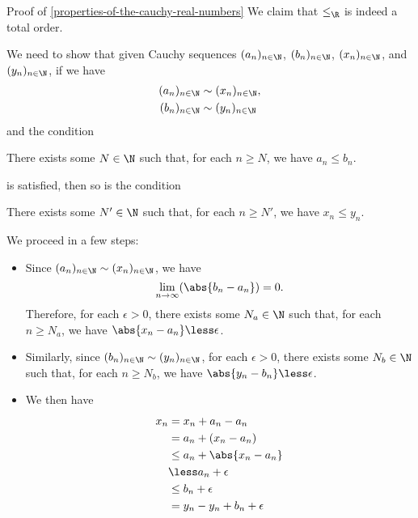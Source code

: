 \begin{Proof}{Proof of \cref{properties-of-the-cauchy-real-numbers}}%
    We claim that $\leq_{\R}$ is indeed a total order.

    We need to show that given Cauchy sequences $(a_{n})_{n\in\N}$, $(b_{n})_{n\in\N}$, $(x_{n})_{n\in\N}$, and $(y_{n})_{n\in\N}$, if we have
    \begin{align*}
        (a_{n})_{n\in\N} &\sim (x_{n})_{n\in\N},\\
        (b_{n})_{n\in\N} &\sim (y_{n})_{n\in\N}
    \end{align*}
    and the condition
    \begin{itemize}
        \itemstar There exists some $N\in\N$ such that, for each $n\geq N$, we have $a_{n}\leq b_{n}$.
    \end{itemize}
    is satisfied, then so is the condition
    \begin{itemize}
        \itemstar There exists some $N'\in\N$ such that, for each $n\geq N'$, we have $x_{n}\leq y_{n}$.
    \end{itemize}
    We proceed in a few steps:
    \begin{itemize}
        \item Since $(a_{n})_{n\in\N}\sim(x_{n})_{n\in\N}$, we have
            \[
                \lim_{n\to\infty}(\abs{b_{n}-a_{n}})%
                =%
                0.%
            \]%
            Therefore, for each $\epsilon\greater0$, there exists some $N_{a}\in\N$ such that, for each $n\geq N_{a}$, we have $\abs{x_{n}-a_{n}}\less\epsilon$.
        \item Similarly, since $(b_{n})_{n\in\N}\sim(y_{n})_{n\in\N}$, for each $\epsilon\greater0$, there exists some $N_{b}\in\N$ such that, for each $n\geq N_{b}$, we have $\abs{y_{n}-b_{n}}\less\epsilon$.
        \item We then have
            \begin{align*}
                x_{n} &=     x_{n}+a_{n}-a_{n}\\
                      &=     a_{n}+(x_{n}-a_{n})\\
                      &\leq  a_{n}+\abs{x_{n}-a_{n}}\\
                      &\less a_{n}+\epsilon\\
                      &\leq  b_{n}+\epsilon\\
                      &=     y_{n}-y_{n}+b_{n}+\epsilon\\

\end{align*}
\end{itemize}
\end{Proof}
